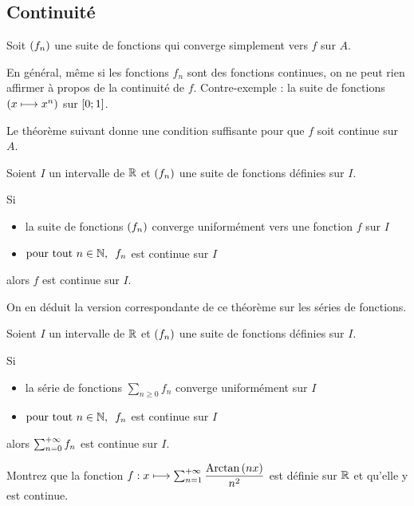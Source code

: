 \subsection{Continuité}

Soit \(\left(f_n\right)\) une suite de fonctions qui converge simplement vers \(f\) sur \(A\).

En général, même si les fonctions \(f_n\) sont des fonctions continues, on ne peut rien affirmer à propos de la continuité de \(f\). Contre-exemple : la suite de fonctions \(\left(x\longmapsto x^n\right)\) sur \(\left[0;1\right]\).

Le théorème suivant donne une condition suffisante pour que \(f\) soit continue sur \(A\).

\begin{theo}
Soient \(I\) un intervalle de \(\mathbb{R}\) et \(\left(f_n\right)\) une suite de fonctions définies sur \(I\).

Si

\begin{itemize}
    \item la suite de fonctions \(\left(f_n\right)\) converge uniformément vers une fonction \(f\) sur \(I\) \\
    \item \(\quantifs{\tpt n\in\N}f_n\) est continue sur \(I\)
\end{itemize}

alors \(f\) est continue sur \(I\).
\end{theo}

On en déduit la version correspondante de ce théorème sur les séries de fonctions.

\begin{cor}
Soient \(I\) un intervalle de \(\mathbb{R}\) et \(\left(f_n\right)\) une suite de fonctions définies sur \(I\).

Si

\begin{itemize}
    \item la série de fonctions \(\sum_{n\geq0}f_n\) converge uniformément sur \(I\) \\
    \item \(\quantifs{\tpt n\in\N}f_n\) est continue sur \(I\)
\end{itemize}

alors \(\sum_{n=0}^{+\infty}f_n\) est continue sur \(I\).
\end{cor}

\begin{exo}
Montrez que la fonction \(f:x\longmapsto\sum_{n=1}^{+\infty}\dfrac{\operatorname{Arctan}\left(nx\right)}{n^2}\) est définie sur \(\mathbb{R}\) et qu'elle y est continue.
\end{exo}

